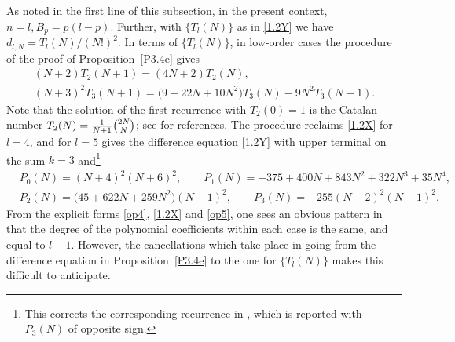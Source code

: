 \documentclass[pdftex]{sigma}
\numberwithin{equation}{section}
\theoremstyle{definition}
\begin{document}
As noted in the first line of this subsection, in the present context, $n=l, B_p = p (l-p)$. Further, with $\{T_l (N) \}$ as
in \eqref{1.2Y} we have $d_{l,N} = T_l (N) /(N!)^2$. In terms of $\{T_l(N) \}$, in low-order cases the procedure of the proof of Proposition~\ref{P3.4e} gives
\begin{gather}
(N+2)T_{2}(N+1) = (4N+2) T_{2}(N) , \nonumber\\
(N+3)^2 T_{3}(N+1) = \bigl(9+22 N + 10 N^2\bigr) T_{3}(N) - 9 N^2 T_{3}(N-1).\label{op4}
\end{gather}
Note that the solution of the first recurrence with $T_2(0)=1$ is
the Catalan number $T_2(N) = {1 \over N+1} \binom{2N}{N}$; see
\cite{St07} for references.
The procedure reclaims \eqref{1.2X} for $l=4$, and for $l=5$ gives the difference equation \eqref{1.2Y} with upper terminal on the sum $k=3$ and\footnote{{This corrects the corresponding recurrence in \cite[two displayed equations below (18)]{St07}, which is reported with~$P_3(N)$ of opposite sign.}}
\begin{align}
&P_0(N) = (N+4)^2(N+6)^2,\qquad P_1(N) = -375+400 N + 843 N^2 + 322 N^3 + 35 N^4, \nonumber \\
&P_2(N) = \bigl(45+622 N + 259 N^2\bigr)(N-1)^2,\qquad P_3(N) = - 255 (N-2)^2 (N-1)^2.\label{op5}
\end{align}
From the explicit forms \eqref{op4}, \eqref{1.2X} and \eqref{op5}, one sees an obvious pattern in that the degree of the polynomial coefficients within each case is the same, and equal to $l-1$. However, the cancellations which take place in going from the difference equation in Proposition~\ref{P3.4e} to the one for
$\{T_l(N) \}$ makes this difficult to anticipate.
\end{document}
